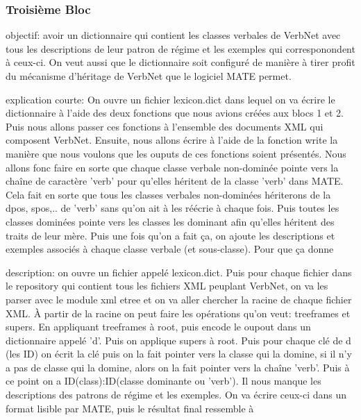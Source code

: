 \subsubsection{Troisième Bloc}

objectif: avoir un dictionnaire qui contient les classes verbales de VerbNet avec tous les descriptions de leur patron de régime  et les exemples qui corresponondent à ceux-ci. On veut aussi que le dictionnaire soit configuré de manière à tirer profit du mécanisme d'héritage de VerbNet que le logiciel MATE permet.

explication courte: On ouvre un fichier lexicon.dict dans lequel on va écrire le dictionnaire à l'aide des deux fonctions que nous avions créées aux blocs 1 et 2. Puis nous allons passer ces fonctions à l'ensemble des documents XML qui composent VerbNet. Ensuite, nous allons écrire à l'aide de la fonction write la manière que nous voulons que les ouputs de ces fonctions soient présentés. Nous allons fonc faire en sorte que chaque classe verbale non-dominée pointe vers la chaîne de caractère 'verb' pour qu'elles héritent de la classe 'verb' dans MATE. Cela fait en sorte que tous les classes verbales non-dominées hériterons de la dpos, spos,.. de 'verb' sans qu'on ait à les réécrie à chaque fois. Puis toutes les classes dominées pointe vers les classes les dominant afin qu'elles héritent des traits de leur mère. Puis une fois qu'on a fait ça, on ajoute les descriptions et exemples associés à chaque classe verbale (et sous-classe). Pour que ça donne 

description: on ouvre un fichier appelé lexicon.dict. Puis pour chaque fichier dans le repository qui contient tous les fichiers XML peuplant VerbNet, on va les parser avec le module xml etree  et on va aller chercher la racine de chaque fichier XML. À partir de la racine on peut faire les opérations qu'on veut: treeframes et supers. En appliquant treeframes à root, puis encode le oupout dans un dictionnaire appelé 'd'. Puis on applique supers à root. Puis pour chaque clé de d (les ID) on écrit la clé puis on la fait pointer vers la classe qui la domine, si il n'y a pas de classe qui la domine, alors on la fait pointer vers la chaîne 'verb'. Puis à ce point on a ID(class):ID(classe dominante ou 'verb'). Il nous manque les descriptions des patrons de régime et les exemples. On va écrire ceux-ci dans un format lisible par MATE, puis le résultat final ressemble à 

